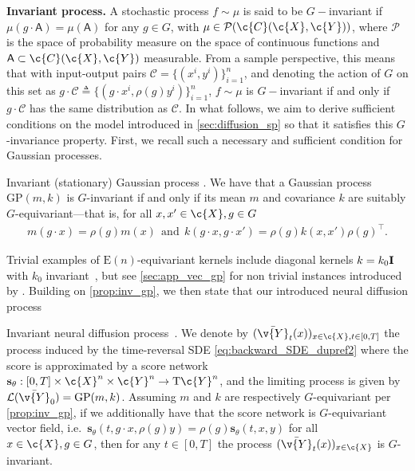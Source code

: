 \textbf{Invariant process.}
A stochastic process \(f \sim \mu\) is said to be \(G-\)invariant if \(\mu(g \cdot \mathsf{A}) = \mu(\mathsf{A})\) for any \(g \in G\), with \(\mu \in \mathcal{P}(\c{C}(\c{X}, \c{Y}))\), where \(\mathcal{P}\) is the space of probability measure on the space of continuous functions and \(\mathsf{A} \subset \c{C}(\c{X}, \c{Y})\) measurable.
From a sample perspective, this means that with input-output pairs \(\mathcal{C} = \{(x^i, y^i)\}_{i=1}^n\), and denoting the action of \(G\) on this set as \(g \cdot \mathcal{C} \triangleq \{(g \cdot x^i, \rho(g) y^i)\}_{i=1}^n\), \(f \sim \mu\) is \(G-\)invariant if and only if \(g \cdot \mathcal{C}\) has the same distribution as \(\mathcal{C}\).
In what follows, we aim to derive sufficient conditions on the model introduced in \cref{sec:diffusion_sp} so that it satisfies this \(G\)-invariance property.
First, we recall such a necessary and sufficient condition for Gaussian processes.
\begin{proposition}{Invariant (stationary) Gaussian process \parencite{holderrieth2021equivariant}.}{}
	\label{prop:inv_gp}
	We have that a Gaussian process \(\mathrm{GP}(m, k)\) is \(G\)-invariant if and only if its mean \(m\) and covariance \(k\) are suitably \(G\)-equivariant---that is, for all \(x,x' \in \c{X}, g \in G\) \begin{align} m(g \cdot x) = \rho(g) m(x) \ \ \text{and} \ \ k(g \cdot x, g \cdot x') = \rho(g) k(x, x') \rho(g)^\top.
	\end{align}
\end{proposition}
Trivial examples of \(\mathrm{E}(n)\)-equivariant kernels include diagonal kernels \(k = k_0 \m{I}\) with \(k_0\) invariant~\parencite{holderrieth2021equivariant}, but see \cref{sec:app_vec_gp} for non trivial instances introduced by \textcite{macedo2010learning}.
Building on \cref{prop:inv_gp}, we then state that our introduced neural diffusion process 

\begin{proposition}{Invariant neural diffusion process~\parencite{yim2023se}.
	}{}
	\label{prop:inv_prior}
	We denote by \((\bar{\v{Y}}_t(x))_{x \in \c{X}, t \in [0, T]}\) the process induced by the time-reversal SDE \eqref{eq:backward_SDE_dupref2} where the score is approximated by a score network \(\mathbf{s}_\theta: [0, T] \times \c{X}^n \times \c{Y}^n \rightarrow \mathrm{T} \c{Y}^n\), and the limiting process is given by \(\mathcal{L}(\bar{\v{Y}}_0) = \mathrm{GP}(m, k)\).
	Assuming \(m\) and \(k\) are respectively \(G\)-equivariant per \cref{prop:inv_gp}, if we additionally have that the score network is \(G\)-equivariant vector field, i.e.\ \(\mathbf{s}_\theta(t, g\cdot x, \rho(g) {y}) = \rho(g) \mathbf{s}_\theta(t, x, {y})\) for all \(x \in \c{X}, g \in G\), then for any \({t \in [0, T]}\) the process \((\bar{\v{Y}}_t(x))_{x \in \c{X}}\) is \(G\)-invariant.
\end{proposition}

